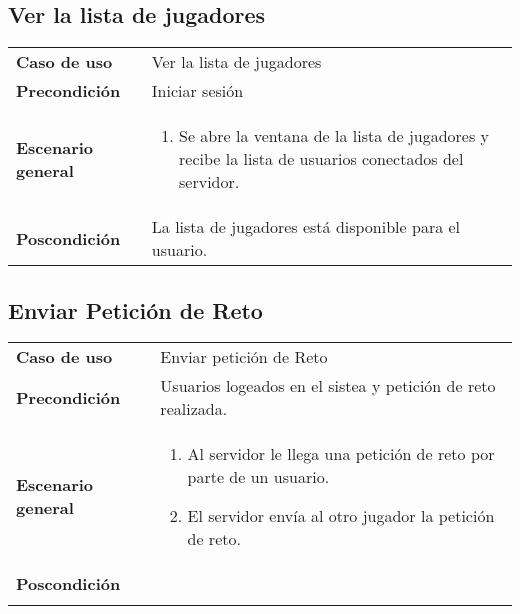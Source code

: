 \subsection{Ver la lista de jugadores}

{\footnotesize
\begin{tabularx}{0.95\textwidth}{p{}|X}

\textbf{Caso de uso} & Ver la lista de jugadores \\

\textbf{Precondición} & Iniciar sesión \\

\textbf{Escenario general} & \begin{enumerate}
\item Se abre la ventana de la lista de jugadores y recibe la lista de
usuarios conectados del servidor.

\end{enumerate} \\

\textbf{Poscondición} & La lista de jugadores está disponible para el usuario.

\end{tabularx}
}


\subsection{Enviar Petición de Reto}

{\footnotesize
\begin{tabularx}{0.95\textwidth}{p{}|X}

\textbf{Caso de uso} & Enviar petición de Reto\\

\textbf{Precondición} & Usuarios logeados en el sistea y petición de reto realizada. \\

\textbf{Escenario general} & \begin{enumerate}

\item Al servidor le llega una petición de reto por parte de un usuario.
\item El servidor envía al otro jugador la petición de reto.

\end{enumerate} \\

\textbf{Poscondición} &  \\ \\

\end{tabularx}
}

